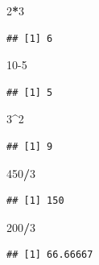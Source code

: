 \documentclass[]{book}
\newenvironment{Shaded}{\begin{snugshade}}{\end{snugshade}}
\newcommand{\DecValTok}[1]{\textcolor[rgb]{0.00,0.00,0.81}{#1}}
\newcommand{\OperatorTok}[1]{\textcolor[rgb]{0.81,0.36,0.00}{\textbf{#1}}}
\begin{document}
\begin{Shaded}
\begin{Highlighting}[]
\DecValTok{2}\OperatorTok{*}\DecValTok{3}
\end{Highlighting}
\end{Shaded}

\begin{verbatim}
## [1] 6
\end{verbatim}

\begin{Shaded}
\begin{Highlighting}[]
\DecValTok{10-5}
\end{Highlighting}
\end{Shaded}

\begin{verbatim}
## [1] 5
\end{verbatim}

\begin{Shaded}
\begin{Highlighting}[]
\DecValTok{3}\OperatorTok{^}\DecValTok{2}
\end{Highlighting}
\end{Shaded}

\begin{verbatim}
## [1] 9
\end{verbatim}

\begin{Shaded}
\begin{Highlighting}[]
\DecValTok{450}\OperatorTok{/}\DecValTok{3}
\end{Highlighting}
\end{Shaded}

\begin{verbatim}
## [1] 150
\end{verbatim}

\begin{Shaded}
\begin{Highlighting}[]
\DecValTok{200}\OperatorTok{/}\DecValTok{3}
\end{Highlighting}
\end{Shaded}

\begin{verbatim}
## [1] 66.66667
\end{verbatim}

\begin{Shaded}
\end{Shaded}
\end{document}
